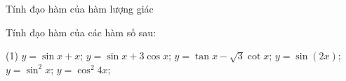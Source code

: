 \begin{dang}{Tính đạo hàm của hàm lượng giác}
\end{dang}

\begin{vd}
	Tính đạo hàm của các hàm số sau:
	\begin{tasks}(1)
		\task $y=\sin x +x$;
		\task $y=\sin x +3\cos x$;
		\task $y=\tan x -\sqrt{3} \cot x$;
		\task $y=\sin (2x)$;
		\task $y=\sin^2 x$;
		\task $y=\cos^2 4x$;
	\end{tasks}
\end{vd} 

